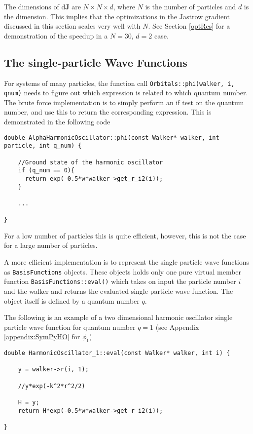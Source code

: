 The dimensions of $\mathrm{d}\mathbf{J}$ are $N\times N\times d$, where $N$ is the number of particles and $d$ is the dimension. This implies that the optimizations in the Jastrow gradient discussed in this section scales very well with $N$. See Section \ref{optRes} for a demonstration of the speedup in a $N=30$, $d=2$ case. 


\subsection{The single-particle Wave Functions}
\label{sec:optSPWFqnumIndie}

For systems of many particles, the function call \verb+Orbitals::phi(walker, i, qnum)+ needs to figure out which expression is related to which quantum number. The brute force implementation is to simply perform an if test on the quantum number, and use this to return the corresponding expression. This is demonstrated in the following code

\clearpage
\vspace{0.25cm}
\begin{lstlisting}
double AlphaHarmonicOscillator::phi(const Walker* walker, int particle, int q_num) {
    
    //Ground state of the harmonic oscillator
    if (q_num == 0){
      return exp(-0.5*w*walker->get_r_i2(i));
    }
    
    ...
    
}
\end{lstlisting}

For a low number of particles this is quite efficient, however, this is not the case for a large number of particles. 

A more efficient implementation is to represent the single particle wave functions as \verb+BasisFunctions+ objects. These objects holds only one pure virtual member function \verb+BasisFunctions::eval()+ which takes on input the particle number $i$ and the walker and returns the evaluated single particle wave function. The object itself is defined by a quantum number $q$. 

The following is an example of a two dimensional harmonic oscillator single particle wave function for quantum number $q=1$ (see Appendix \ref{appendix:SymPyHO} for $\phi_1$)

\vspace{0.25cm}
\begin{lstlisting}
double HarmonicOscillator_1::eval(const Walker* walker, int i) {

    y = walker->r(i, 1);
    
    //y*exp(-k^2*r^2/2)
    
    H = y;
    return H*exp(-0.5*w*walker->get_r_i2(i));
    
}
\end{lstlisting}

